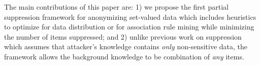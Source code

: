 The main contributions of this paper are: 
1) we propose the first partial suppression framework for anonymizing
set-valued data which includes heuristics to optimize for data distribution
or for association rule mining while minimizing the number of items suppressed; 
and 2) unlike previous work on suppression which 
assumes that attacker's knowledge contains {\em only} non-sensitive data, 
the framework allows the background knowledge to be combination of 
{\em any} items.


